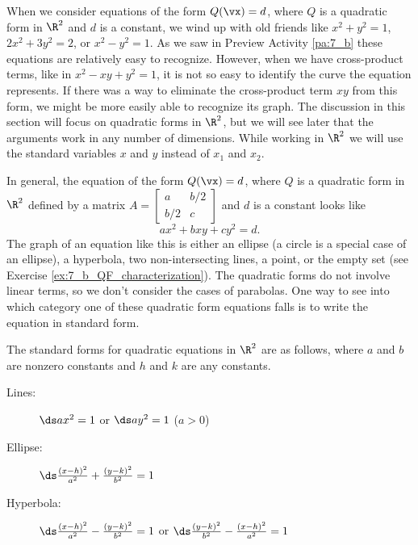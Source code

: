 \label{sec:eqs_quad_r2}

When we consider equations of the form $Q(\vx) = d$, where $Q$ is a quadratic form in $\R^2$ and $d$ is a constant, we wind up with old friends like $x^2+y^2=1$, $2x^2+3y^2=2$, or $x^2-y^2=1$. As we saw in Preview Activity \ref{pa:7_b} these equations are relatively easy to recognize. However, when we have cross-product terms, like in $x^2-xy+y^2=1$, it is not so easy to identify the curve the equation represents. If there was a way to eliminate the cross-product term $xy$ from this form, we might be more easily able to recognize its graph. The discussion in this section will focus on quadratic forms in $\R^2$, but we will see later that the arguments work in any number of dimensions. While working in $\R^2$ we will use the standard variables $x$ and $y$ instead of $x_1$ and $x_2$.

In general, the equation of the form $Q(\vx) = d$, where $Q$ is a quadratic form in $\R^2$ defined by a matrix $A = \left[ \begin{array}{cc} a&b/2\\b/2&c \end{array} \right] $ and $d$ is a constant looks like  
\[ax^2+bxy+cy^2 = d.\]
The graph of an equation like this is either an ellipse (a circle is a special case of an ellipse), a hyperbola, two non-intersecting lines, a point, or the empty set (see Exercise \ref{ex:7_b_QF_characterization}). The quadratic forms do not involve linear terms, so we don't consider the cases of parabolas. One way to see into which category one of these quadratic form equations falls is to write the equation in standard form.

The standard forms for quadratic equations in $\R^2$ are as follows, where $a$ and $b$ are nonzero constants and $h$ and $k$ are any constants.
\begin{description}
\item[Lines:] $\ds ax^2 = 1$ or $\ds ay^2=1$ ($a > 0$)
\item[Ellipse: ] $\ds \frac{(x-h)^2}{a^2} + \frac{(y-k)^2}{b^2} = 1$
\item[Hyperbola: ] $\ds \frac{(x-h)^2}{a^2} - \frac{(y-k)^2}{b^2} = 1$  or $\ds \frac{(y-k)^2}{b^2} - \frac{(x-h)^2}{a^2} = 1$
\end{description}


